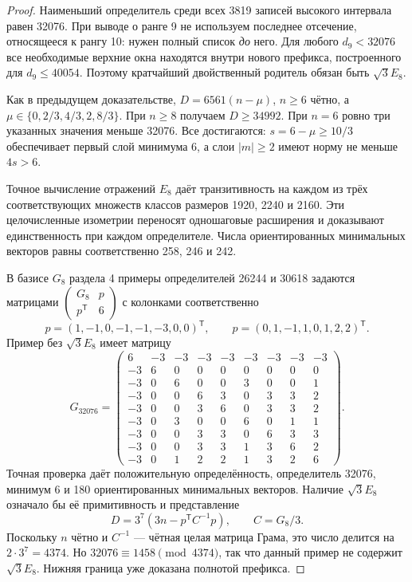 \documentclass[11pt,a4paper]{article}
\theoremstyle{remark}\newtheorem{remark}[theorem]{Замечание}
\begin{document}
\begin{proof}
Наименьший определитель среди всех 3819 записей высокого интервала равен 32076. При выводе о ранге 9 не используем последнее отсечение, относящееся к рангу 10: нужен полный список \emph{до} него. Для любого $d_9<32076$ все необходимые верхние окна находятся внутри нового префикса, построенного для $d_9\le40054$. Поэтому кратчайший двойственный родитель обязан быть $\sqrt3E_8$.

Как в предыдущем доказательстве, $D=6561(n-\mu)$, $n\ge6$ чётно, а $\mu\in\{0,2/3,4/3,2,8/3\}$. При $n\ge8$ получаем $D\ge34992$. При $n=6$ ровно три указанных значения меньше 32076. Все достигаются: $s=6-\mu\ge10/3$ обеспечивает первый слой минимума 6, а слои $|m|\ge2$ имеют норму не меньше $4s>6$.

Точное вычисление отражений $E_8$ даёт транзитивность на каждом из трёх соответствующих множеств классов размеров 1920, 2240 и 2160. Эти целочисленные изометрии переносят одношаговые расширения и доказывают единственность при каждом определителе. Числа ориентированных минимальных векторов равны соответственно 258, 246 и 242.

В базисе $G_8$ раздела 4 примеры определителей 26244 и 30618 задаются матрицами $\left(\begin{smallmatrix}G_8&p\\p^{\mathsf T}&6\end{smallmatrix}\right)$ с колонками соответственно
\[
p=(1,-1,0,-1,-1,-3,0,0)^{\mathsf T},\qquad
p=(0,1,-1,1,0,1,2,2)^{\mathsf T}.
\]
Пример без $\sqrt3E_8$ имеет матрицу
\[
G_{32076}=
\begin{pmatrix}
6&-3&-3&-3&-3&-3&-3&-3&-3\\
-3&6&0&0&0&0&0&0&0\\
-3&0&6&0&0&3&0&0&1\\
-3&0&0&6&3&0&3&3&2\\
-3&0&0&3&6&0&3&3&2\\
-3&0&3&0&0&6&0&1&1\\
-3&0&0&3&3&0&6&3&3\\
-3&0&0&3&3&1&3&6&2\\
-3&0&1&2&2&1&3&2&6
\end{pmatrix}.
\]
Точная проверка даёт положительную определённость, определитель 32076, минимум 6 и 180 ориентированных минимальных векторов. Наличие $\sqrt3E_8$ означало бы её примитивность и представление
\[
D=3^7(3n-p^{\mathsf T}C^{-1}p),\qquad C=G_8/3.
\]
Поскольку $n$ чётно и $C^{-1}$ --- чётная целая матрица Грама, это число делится на $2\cdot3^7=4374$. Но $32076\equiv1458\pmod{4374}$, так что данный пример не содержит $\sqrt3E_8$. Нижняя граница уже доказана полнотой префикса.
\end{proof}
\end{document}

